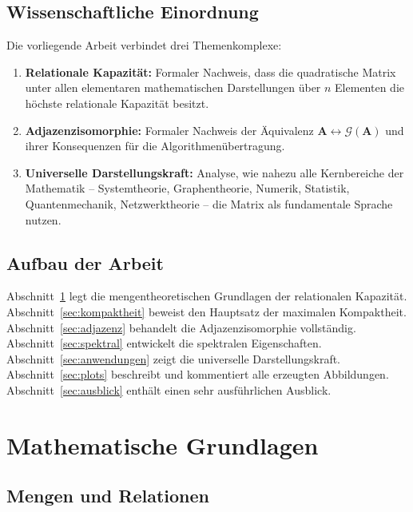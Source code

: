 ﻿\documentclass[12pt, a4paper]{article}
\theoremstyle{definition}
\theoremstyle{remark}
\newcommand{\vA}{\bm{A}}
\begin{document}
\subsection{Wissenschaftliche Einordnung}
\label{subsec:einordnung}

Die vorliegende Arbeit verbindet drei Themenkomplexe:

\begin{enumerate}[label=(\roman*)]
  \item \textbf{Relationale Kapazität:} Formaler Nachweis, dass die quadratische
    Matrix unter allen elementaren mathematischen Darstellungen über $n$
    Elementen die höchste relationale Kapazität besitzt.

  \item \textbf{Adjazenzisomorphie:} Formaler Nachweis der Äquivalenz
    $\vA \leftrightarrow \mathcal{G}(\vA)$ und ihrer Konsequenzen für die
    Algorithmenübertragung.

  \item \textbf{Universelle Darstellungskraft:} Analyse, wie nahezu alle
    Kernbereiche der Mathematik -- Systemtheorie, Graphentheorie, Numerik,
    Statistik, Quantenmechanik, Netzwerktheorie -- die Matrix als
    fundamentale Sprache nutzen.
\end{enumerate}

\subsection{Aufbau der Arbeit}
\label{subsec:aufbau}

Abschnitt~\ref{sec:grundlagen} legt die mengentheoretischen Grundlagen der
relationalen Kapazität. Abschnitt~\ref{sec:kompaktheit} beweist den
Hauptsatz der maximalen Kompaktheit. Abschnitt~\ref{sec:adjazenz} behandelt
die Adjazenzisomorphie vollständig. Abschnitt~\ref{sec:spektral} entwickelt
die spektralen Eigenschaften. Abschnitt~\ref{sec:anwendungen} zeigt die
universelle Darstellungskraft. Abschnitt~\ref{sec:plots} beschreibt und
kommentiert alle erzeugten Abbildungen. Abschnitt~\ref{sec:ausblick} enthält
einen sehr ausführlichen Ausblick.

\section{Mathematische Grundlagen}
\label{sec:grundlagen}

\subsection{Mengen und Relationen}
\label{subsec:mengen}
\end{document}
